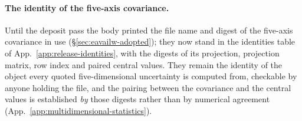 \paragraph{The identity of the five-axis covariance.} Until the deposit pass the body printed the file name and digest of the five-axis covariance in use (\S\ref{sec:eavailw-adopted}); they now stand in the identities table of App.~\ref{app:release-identities}, with the digests of its projection, projection matrix, row index and paired central values. They remain the identity of the object every quoted five-dimensional uncertainty is computed from, checkable by anyone holding the file, and the pairing between the covariance and the central values is established \emph{by} those digests rather than by numerical agreement (App.~\ref{app:multidimensional-statistics}).
